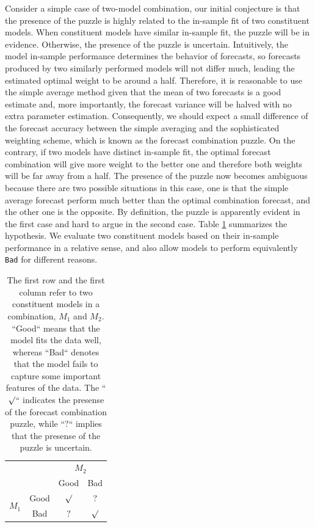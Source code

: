 \documentclass{monashthesis}
\begin{document}
Consider a simple case of two-model combination, our initial conjecture is that the presence of the puzzle is highly related to the in-sample fit of two constituent models. When constituent models have similar in-sample fit, the puzzle will be in evidence. Otherwise, the presence of the puzzle is uncertain. Intuitively, the model in-sample performance determines the behavior of forecasts, so forecasts produced by two similarly performed models will not differ much, leading the estimated optimal weight to be around a half. Therefore, it is reasonable to use the simple average method given that the mean of two forecasts is a good estimate and, more importantly, the forecast variance will be halved with no extra parameter estimation. Consequently, we should expect a small difference of the forecast accuracy between the simple averaging and the sophisticated weighting scheme, which is known as the forecast combination puzzle. On the contrary, if two models have distinct in-sample fit, the optimal forecast combination will give more weight to the better one and therefore both weights will be far away from a half. The presence of the puzzle now becomes ambiguous because there are two possible situations in this case, one is that the simple average forecast perform much better than the optimal combination forecast, and the other one is the opposite. By definition, the puzzle is apparently evident in the first case and hard to argue in the second case. Table \ref{tab:1} summarizes the hypothesis. We evaluate two constituent models based on their in-sample performance in a relative sense, and also allow models to perform equivalently \texttt{Bad} for different reasons.

\begin{table}[ht]
\centering
\begin{tabular}{cccc}
                       &      & \multicolumn{2}{c}{$M_2$} \\
                       &      & Good       & Bad       \\
\multirow{2}{*}{$M_1$} & Good & $\surd$    & $?$ \\
                       & Bad  & $?$        & $\surd$
\end{tabular}
\caption{The first row and the first column refer to two constituent models in a combination, $M_1$ and $M_2$. ``Good`` means that the model fits the data well, whereas ``Bad`` denotes that the model fails to capture some important features of the data. The ``$\surd$`` indicates the presense of the forecast combination puzzle, while ``$?$`` implies that the presense of the puzzle is uncertain.}
\label{tab:1}
\end{table}
\end{document}

